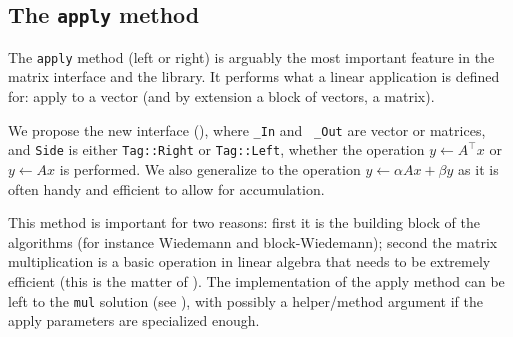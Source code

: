 \subsection{The \texttt{apply} method}\label{ssec:apply}
%
%
\par
%
The \texttt{apply} method (left or right) is arguably the most important
feature in the matrix interface and the \linbox library. It performs what a
linear application is defined for: apply to a vector (and by extension  a block
of vectors, \ie a matrix).
%
\par
%
We propose the new interface (), where {\tt \_In} and {\tt
\_Out} are vector or matrices, and {\tt Side} is either {\tt Tag::Right} or
{\tt Tag::Left}, whether the operation $y \gets A^{\top} x$ or  $y \gets A x$ is
performed. We also generalize to the operation $y \gets \alpha A x + \beta y$ as
it is often handy and efficient to allow for accumulation.
%

%
This method is important for two reasons: first it is the building block of the
\applin algorithms (for instance Wiedemann and block-Wiedemann); second the
matrix multiplication is a basic operation in linear algebra that needs to be
extremely efficient (this is the matter of ).
%
%
%
The implementation of the apply method can be left to the {\tt mul} solution
(see ), with possibly a helper/method argument if the apply
parameters are specialized enough.
%
%
%
